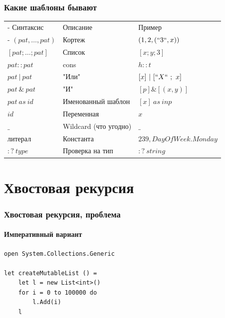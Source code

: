 \documentclass[xetex,mathserif,serif]{beamer}
\begin{document}
	\begin{frame}
		\frametitle{Какие шаблоны бывают}
		\begin{small}
			\begin{tabu} {| X[0.9 l p] | X[1 l p] | X[1 l p] |}
				\tabucline-
				Синтаксис                               & Описание                  & Пример                  \\
				\tabucline-
				\everyrow{\tabucline-}
				$(pat, \ldots, pat)$                    & Кортеж                    & $(1, 2, (``3``, x))$    \\
				$[pat; \ldots; pat]$                    & Список                    & $[x; y; 3]$             \\
				$pat :: pat$                            & cons                      & $h :: t$                \\
				$pat\ |\ pat$                           & "Или"                     & $[x]\ |\ [``X``\ ;\ x]$ \\
				$pat\ \&\ pat$                          & "И"                       & $[p] \& [(x, y)]$       \\
				$pat\ as\ id$                           & Именованный шаблон        & $[x]\ as\ inp$          \\
				$id$                                    & Переменная                & $x$                     \\
				$\_$                                    & Wildcard (что угодно)     & $\_$                    \\
				литерал                                 & Константа                 & $239, DayOfWeek.Monday$ \\
				$:?\ type$                              & Проверка на тип           & $:?\ string$            \\
			\end{tabu}
		\end{small}
	\end{frame}

	\section{Хвостовая рекурсия}

	\begin{frame}[fragile]
		\frametitle{Хвостовая рекурсия, проблема}
		\framesubtitle{Императивный вариант}
		\begin{verbatim}
open System.Collections.Generic

let createMutableList () =
    let l = new List<int>()
    for i = 0 to 100000 do
        l.Add(i)
    l
		\end{verbatim}
	\end{frame}
\end{document}
